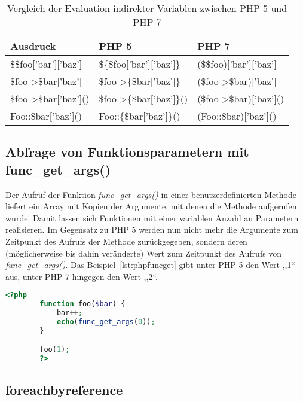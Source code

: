     \begin{table}[]
        \caption{Vergleich der Evaluation indirekter Variablen zwischen PHP 5 und PHP 7}
        \label{tab:indirect-expressions}
        \begin{tabular}{lll}
        \textbf{Ausdruck}               & \textbf{PHP 5}                    & \textbf{PHP 7}                \\ \hline
        \$\$foo{[}'bar'{]}{[}'baz'{]}   & \$\{\$foo{[}'bar'{]}{[}'baz'{]}\} & (\$\$foo){[}'bar'{]}{[}'baz'{]} \\ \hline
        \$foo->\$bar{[}'baz'{]}         & \$foo->\{\$bar{[}'baz'{]}\}       & (\$foo->\$bar){[}'baz'{]}       \\ \hline
        \$foo->\$bar{[}'baz'{]}()       & \$foo->\{\$bar{[}'baz'{]}\}()     & (\$foo->\$bar){[}'baz'{]}()     \\ \hline
        Foo::\$bar{[}'baz'{]}()         & Foo::\{\$bar{[}'baz'{]}\}()       & (Foo::\$bar){[}'baz'{]}()    
        \end{tabular}
    \end{table}

    \subsection{Abfrage von Funktionsparametern mit func\_get\_args()}
    Der Aufruf der Funktion \textit{func\_get\_args()} in einer benutzerdefinierten Methode liefert ein Array mit Kopien der 
    Argumente, mit denen die Methode aufgerufen wurde. Damit lassen sich Funktionen mit einer variablen Anzahl an Parametern 
    realisieren. Im Gegensatz zu \ac{PHP} 5 werden nun nicht mehr die Argumente zum Zeitpunkt des Aufrufs der Methode 
    zurückgegeben, sondern deren (möglicherweise bis dahin veränderte) Wert zum Zeitpunkt des Aufrufs von 
    \textit{func\_get\_args()}. Das Beispiel~\ref{lst:phpfuncget} gibt unter \ac{PHP} 5 den Wert ,,1`` aus, unter \ac{PHP} 7 
    hingegen den Wert ,,2``.

    \begin{lstlisting}[language=php, caption={Beispiel des Aufrufs von func\_get\_args()}, label={lst:phpfuncget}]
        <?php
        function foo($bar) {
            bar++;
            echo(func_get_args(0));
        }

        foo(1);
        ?>
    \end{lstlisting}

    \subsection{foreachbyreference}

